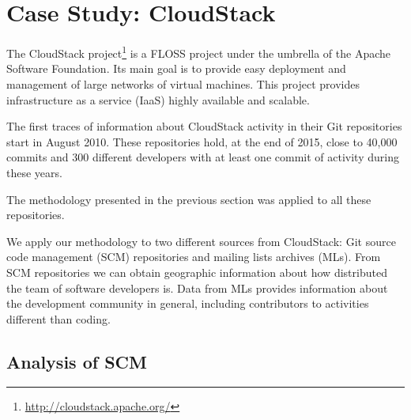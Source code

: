 \documentclass{sig-alternate-05-2015}
\begin{document}
\section{Case Study: CloudStack}
\label{sec:case-study}

The CloudStack project\footnote{\url{http://cloudstack.apache.org/}} is a FLOSS project under the umbrella of the Apache Software Foundation. Its main goal is to provide easy deployment and management of large networks of virtual machines. This project provides infrastructure as a service (IaaS) highly available and scalable.

The first traces of information about CloudStack activity in their Git repositories start in August 2010. These repositories hold, at the end of 2015, close to 40,000 commits and 300 different developers with at least one commit of activity during these years.

The methodology presented in the previous section was applied to all these repositories.





We apply our methodology to two different
sources from CloudStack: Git source code management (SCM) repositories and mailing lists archives (MLs). From SCM repositories we can obtain geographic information about how distributed the team of software developers is. Data from MLs provides information about the development community in general, including contributors to activities different than coding.

\subsection{Analysis of SCM}
\end{document}
